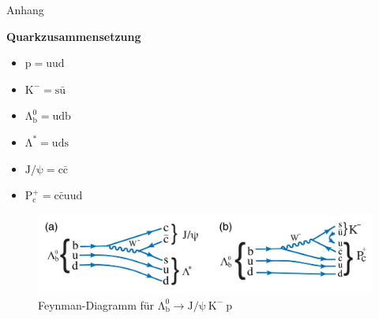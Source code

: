 \documentclass[aspectratio=169]{beamer} %
\begin{document}
  \begin{frame}{Anhang}
      \begin{minipage}{0.4\textwidth}
        \textbf{Quarkzusammensetzung}
        \begin{itemize}
          \item $\mathrm{p = uud}$
          \item $\mathrm{K^- = s\bar{u}}$
          \item $\mathrm{\Lambda_b^0 = udb}$
          \item $\mathrm{\Lambda^* = uds}$
          \item $\mathrm{J/\psi = c\bar{c}}$
          \item $\mathrm{P_c^+ = c\bar{c}uud}$
        \end{itemize}
      \end{minipage}
      \hfill
      \begin{minipage}{0.58\textwidth}
        \begin{figure}
          \centering
          \includegraphics[width=\linewidth, height=0.5\textheight, keepaspectratio]{Images/98cb82e8-f82b-43ad-8d90-3c7881558f42.jpg}
          \caption{Feynman-Diagramm für $\mathrm{\Lambda_b^0} \to \mathrm{J}/\mathrm{\psi}\:\mathrm{K}^-\:\mathrm{p}$\\\scriptsize\cite{Aaij.2015}}
        \end{figure}
      \end{minipage}
      

\end{frame}
\end{document}
